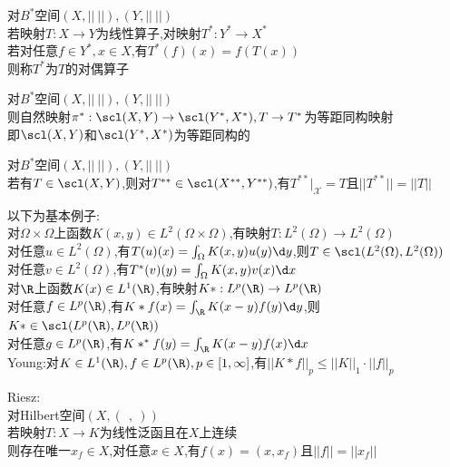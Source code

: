 \begin{dingyi}
对$B^*$空间$(X,||\ ||),(Y,||\ ||)$\\
若映射$T:X\to Y$为线性算子,对映射$T^{*}:Y^{*}\to X^{*}$\\
若对任意$f\in Y^{*}, x\in X$,有$T^{*}(f)(x)=f(T(x))$\\
则称$T^{*}$为$T$的对偶算子
\end{dingyi}

\begin{dingli}
对$B^*$空间$(X,||\ ||),(Y,||\ ||)$\\
则自然映射$\pi^{*}:\scl(X,Y)\to\scl(Y^{*},X^{*}),T\to T^{*}$为等距同构映射\\
即$\scl(X,Y)$和$\scl(Y^{*},X^{*})$为等距同构的
\end{dingli}

\begin{dingli}
对$B^*$空间$(X,||\ ||),(Y,||\ ||)$\\
若有$T\in\scl(X,Y)$,则对$T^{**}\in \scl(X^{**},Y^{**})$,有$T^{**}|_{\mathscr{X}}=T$且$||T^{**}||=||T||$
\end{dingli}

\begin{zhu}
以下为基本例子:\\
对$\Omega\times\Omega$上函数$K(x,y)\in L^{2}(\Omega\times\Omega)$,有映射$T:L^{2}(\Omega)\to L^{2}(\Omega)$\\
对任意$u\in L^{2}(\Omega)$,有$T(u)(x)=\int_{\Omega}K(x,y)u(y)\d y$,则$T\in \scl(L^{2}(\Omega),L^{2}(\Omega))$\\
对任意$v\in L^{2}(\Omega)$,有$T^{*}(v)(y)=\int_{\Omega}K(x,y)v(x)\d x$\\
对$\R$上函数$K(x)\in L^{1}(\R)$,有映射$K*:L^{p}(\R)\to L^{p}(\R)$\\
对任意$f\in L^{p}(\R)$,有$K*f(x)=\int_{\R}K(x-y)f(y)\d y$,则$K*\in \scl(L^{p}(\R),L^{p}(\R))$\\
对任意$g\in L^{p}(\R)$,有$K*^{*}f(y)=\int_{\R}K(x-y)f(x)\d x$\\
Young:对$K\in L^{1}(\R), f\in L^{p}(\R), p\in[1,\infty]$,有$||K*f||_{p}\leq ||K||_{1}\cdot||f||_{p}$
\end{zhu}

\begin{dingli}
Riesz:\\
对Hilbert空间$(X,(\ \ ,\ ))$\\
若映射$T:X\to K$为线性泛函且在$X$上连续\\
则存在唯一$x_{f}\in X$,对任意$x\in X$,有$f(x)=(x,x_{f})$且$||f||=||x_{f}||$
\end{dingli}

